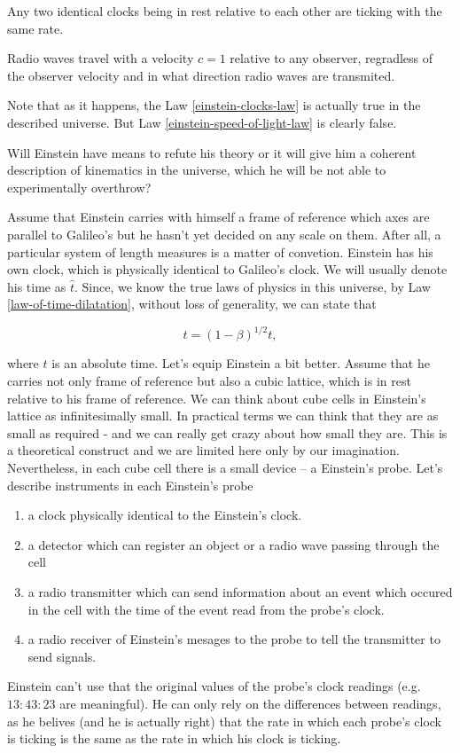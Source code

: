 \documentclass[main.tex]{subfiles}
\begin{document}
\begin{law}
\label{einstein-clocks-law}
Any two identical clocks being in rest relative to each other are ticking with the same rate.
\end{law}
 
\begin{law}
\label{einstein-speed-of-light-law}
Radio waves travel with a velocity $c = 1$ relative to any observer, regradless of the observer velocity and in what direction radio waves are transmited.
\end{law}

Note that as it happens, the Law \ref{einstein-clocks-law} is actually true in the described universe. But Law \ref{einstein-speed-of-light-law} is clearly false.

Will Einstein have means to refute his theory or it will give him a coherent description of kinematics in the universe, which he will be not able to experimentally overthrow?

Assume that Einstein carries with himself a frame of reference which axes are parallel to Galileo's but he hasn't yet decided on any scale on them. After all, a particular system of length measures is a matter of convetion. Einstein has his own clock, which is physically identical to Galileo's clock. We will usually denote his time as $\hat{t}$.
Since, we know the true laws of physics in this universe, by Law \ref{law-of-time-dilatation}, without loss of generality, we can state that 

\begin{equation}
\label{ether-time-dilatation}
\hat{t} = (1 - \beta)^{1/2} t,
\end{equation} 

where $t$ is an absolute time. Let's equip Einstein a bit better. Assume that he carries not only frame of reference but also a cubic lattice, which is in rest relative to his frame of reference. We can think about cube cells in Einstein's lattice as infinitesimally small. In practical terms we can think that they are as small as required - and we can really get crazy about how small they are. This is a theoretical construct and we are limited here only by our imagination. Nevertheless, in each cube cell there is a small device -- a Einstein's probe. Let's describe instruments in each Einstein's probe
\begin{enumerate}
\item a clock physically identical to the Einstein's clock.
\item a detector which can register an object or a radio wave passing through the cell
\item a radio transmitter which can send information about an event which occured in the cell with the time of the event read from the probe's clock.
\item a radio receiver of Einstein's mesages to the probe to tell the transmitter to send signals.
 \end{enumerate} 
Einstein can't use that the original values of the probe's clock readings (e.g. $13:43:23$ are meaningful). He can only rely on the differences between readings, as he belives (and he is actually right) that the rate in which each probe's clock is ticking is the same as the rate in which his clock is ticking.
\end{document}

